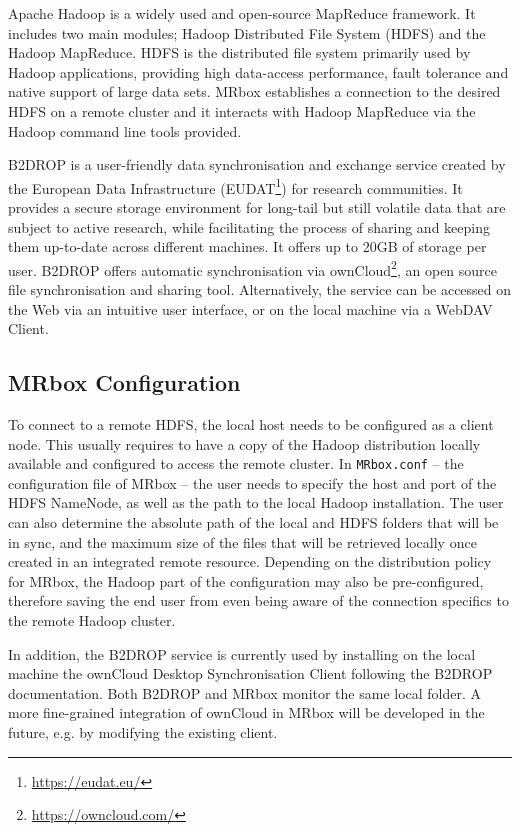 Apache Hadoop is a widely used and open-source MapReduce framework. It includes two main modules; Hadoop Distributed File System (HDFS) and the Hadoop MapReduce. HDFS is the distributed file system primarily used by Hadoop applications, providing high data-access performance, fault tolerance and native support of large data sets. MRbox establishes a connection to the desired HDFS on a remote cluster and it interacts with Hadoop MapReduce via the Hadoop command line tools provided.

B2DROP\cite{b2drop} is a user-friendly data synchronisation and exchange service created by the European Data Infrastructure (EUDAT\footnote{\url{https://eudat.eu/}}) for research communities. It provides a secure storage environment for long-tail but still volatile data that are subject to active research, while facilitating the process of sharing and keeping them up-to-date across different machines. It offers up to 20GB of storage per user. B2DROP offers automatic synchronisation via ownCloud\footnote{\url{https://owncloud.com/}}, an open source file synchronisation and sharing tool. Alternatively, the service can be accessed on the Web via an intuitive user interface, or on the local machine via a WebDAV Client.

\subsection{MRbox Configuration}
To connect to a remote HDFS, the local host needs to be configured as a client node. This usually requires to have a copy of the Hadoop distribution locally available and configured to access the remote cluster\cite{hadoopinst}. In \texttt{MRbox.conf} -- the configuration file of MRbox -- the user needs to specify the host and port of the HDFS NameNode, as well as the path to the local Hadoop installation. The user can also determine the absolute path of the local and HDFS folders that will be in sync, and the maximum size of the files that will be retrieved locally once created in an integrated remote resource. Depending on the distribution policy for MRbox, the Hadoop part of the configuration may also be pre-configured, therefore saving the end user from even being aware of the connection specifics to the remote Hadoop cluster.

In addition, the B2DROP service is currently used by installing on the local machine the ownCloud Desktop Synchronisation Client following the B2DROP documentation. Both B2DROP and MRbox monitor the same local folder. A more fine-grained integration of ownCloud in MRbox will be developed in the future, e.g. by modifying the existing client.

